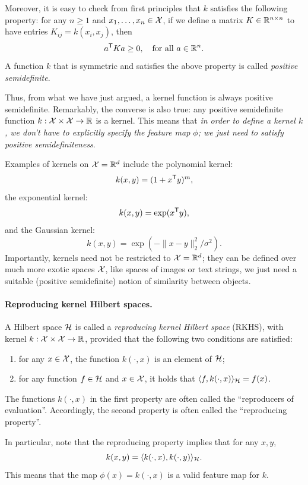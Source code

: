 \documentclass{article}
\begin{document}
Moreover, it is easy to check from first principles that $k$ satisfies the
following property: for any $n \geq 1$ and $x_1,\dots,x_n \in \mathcal{X}$, if we define
a matrix $K \in \mathbb{R}^{n \times n}$ to have entries $K_{ij} = k(x_i, x_j)$, then 
\[
a^{\mathsf{T}} K a \geq 0, \quad \text{for all $a \in \mathbb{R}^n$}.
\]
A function $k$ that is symmetric and satisfies the above property is called 
\emph{positive semidefinite}. 

Thus, from what we have just argued, a kernel function is always positive
semidefinite. Remarkably, the converse is also true: any positive semidefinite
function $k : \mathcal{X} \times \mathcal{X} \to \mathbb{R}$ is a kernel. This means that \emph{in order
  to define a kernel $k$, we don't have to explicitly specify the feature map 
  $\phi$; we just need to satisfy positive semidefiniteness}.  

Examples of kernels on $\mathcal{X} = \mathbb{R}^d$ include the polynomial kernel:   
\[
k(x,y) = (1 + x^{\mathsf{T}} y)^m,
\]
the exponential kernel:
\[
k(x,y) = \exp(x^{\mathsf{T}} y),
\]
and the Gaussian kernel: 
\[
k(x,y) = \exp(-\|x-y\|_2^2 / \sigma^2).
\]
Importantly, kernels need not be restricted to $\mathcal{X} = \mathbb{R}^d$; they can be defined
over much more exotic spaces $\mathcal{X}$, like spaces of images or text strings, we
just need a suitable (positive semidefinite) notion of similarity between
objects.   

\paragraph{Reproducing kernel Hilbert spaces.} 

A Hilbert space $\mathcal{H}$ is called a \emph{reproducing kernel Hilbert space}
(RKHS), with kernel $k : \mathcal{X} \times \mathcal{X} \to \mathbb{R}$, provided that the following two 
conditions are satisfied: 
\begin{enumerate}
\item for any $x \in \mathcal{X}$, the function $k(\cdot, x)$ is an element of $\mathcal{H}$;   
\item for any function $f \in \mathcal{H}$ and $x \in \mathcal{X}$, it holds that $\langle f,
  k(\cdot, x) \rangle_{\mathcal{H}} = f(x)$. 
\end{enumerate}
The functions $k(\cdot, x)$ in the first property are often called the
``reproducers of evaluation''. Accordingly, the second property is often called
the ``reproducing property''. 

In particular, note that the reproducing property implies that for any $x,y$,
\[
k(x,y) = \langle k(\cdot, x), k(\cdot, y) \rangle_{\mathcal{H}}.
\]
This means that the map $\phi(x) = k(\cdot, x)$ is a valid feature map for $k$. 
\end{document}
